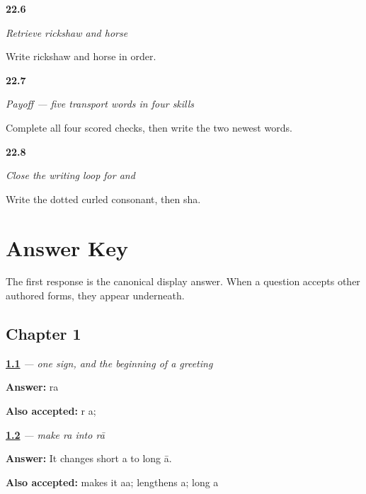 \noindent\begin{minipage}[t]{\linewidth}
\raggedright
\hypertarget{review-MW-R17-transport-new-two-recall}{\textbf{22.6}} \emph{Retrieve rickshaw and horse}\par
\small Write rickshaw and horse in order.
\end{minipage}\par\medskip

\noindent\begin{minipage}[t]{\linewidth}
\raggedright
\hypertarget{review-MW-C17-transport-five-payoff}{\textbf{22.7}} \emph{Payoff — five transport words in four skills}\par
\small Complete all four scored checks, then write the two newest words.
\end{minipage}\par\medskip

\noindent\begin{minipage}[t]{\linewidth}
\raggedright
\hypertarget{review-MW-R17-script-close-recall}{\textbf{22.8}} \emph{Close the writing loop for  and }\par
\small Write the dotted curled consonant, then sha.
\end{minipage}\par\medskip

\chapter*{Answer Key}

The first response is the canonical display answer. When a question accepts other authored forms, they appear underneath.

\section*{Chapter 1}

\noindent\begin{minipage}[t]{\linewidth}
\raggedright
\hyperlink{review-MW-W01-ra-read}{\textbf{1.1}} \emph{ — one sign, and the beginning of a greeting}\par
\small \textbf{Answer:} ra\par
\footnotesize \textbf{Also accepted:} r a; 
\end{minipage}\par\medskip

\noindent\begin{minipage}[t]{\linewidth}
\raggedright
\hyperlink{review-MW-W01-aa-matra-change}{\textbf{1.2}} \emph{ — make \emph{ra} into \emph{rā}}\par
\small \textbf{Answer:} It changes short a to long ā.\par
\footnotesize \textbf{Also accepted:} makes it aa; lengthens a; long a
\end{minipage}\par\medskip

